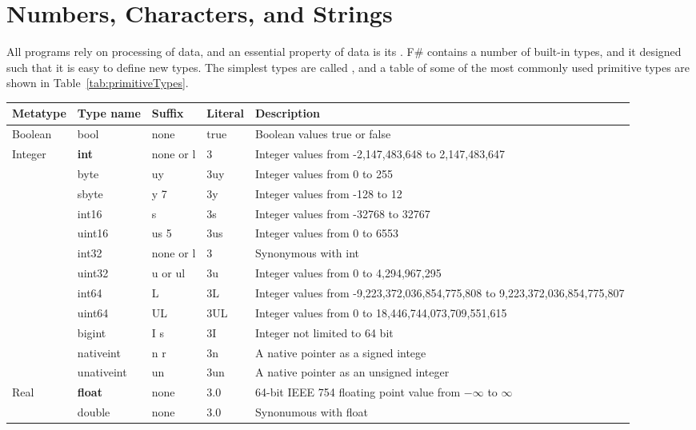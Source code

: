\chapter{Numbers, Characters, and Strings}
All programs rely on processing of data, and an essential property of data is its . F\# contains a number of built-in types, and it designed such that it is easy to define new types. The simplest types are called , and a table of some of the most commonly used primitive types are shown in Table~\ref{tab:primitiveTypes}.
\begin{table}
  \centering
  \begin{tabularx}{0.9\textwidth}{|l|l|l|l|X|}
    \hline
    Metatype & Type name & Suffix & Literal & Description\\
    \hline
    Boolean & bool & none & true & Boolean values true or false \\
    \hline
    Integer & \textbf{int} & none or l & 3 & Integer values from -2,147,483,648 to 2,147,483,647 \\
             &byte & uy  & 3uy &Integer values from 0 to 255\\
             &sbyte & y 7& 3y &Integer values from -128 to 12\\
             &int16 & s  & 3s &Integer values from -32768 to 32767\\
             &uint16 & us 5& 3us &Integer values from 0 to 6553\\
             &int32 & none or l  & 3 &Synonymous with int\\
             &uint32 & u or ul  & 3u & Integer values from 0 to 4,294,967,295\\
             &int64 & L  & 3L &Integer values from -9,223,372,036,854,775,808 to 9,223,372,036,854,775,807\\
             &uint64 & UL  & 3UL &Integer values from 0 to 18,446,744,073,709,551,615\\
             &bigint & I s& 3I &Integer not limited to 64 bit\\
             &nativeint & n r& 3n &A native pointer as a signed intege\\
             &unativeint & un  &3un &A native pointer as an unsigned integer\\
    \hline
    Real & \textbf{float} & none  & 3.0 & 64-bit IEEE 754 floating point value from $-\infty$ to $\infty$\\
             & double &none & 3.0 & Synonumous with float\\

\end{tabularx}
\end{table}
